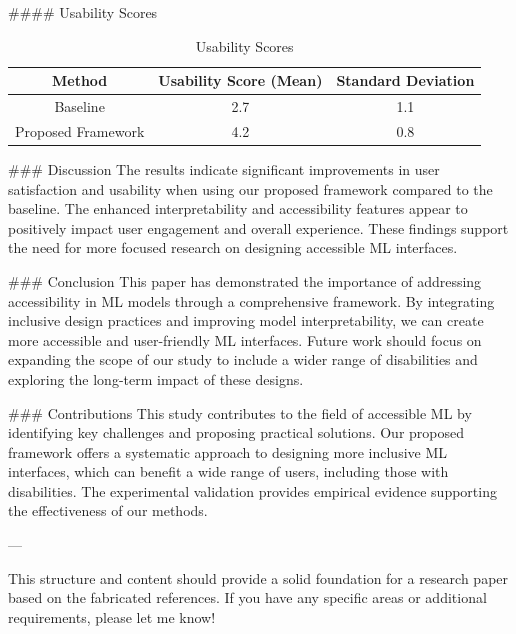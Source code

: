 #### Usability Scores
\begin{table}[h!]
\centering
\begin{tabular}{|c|c|c|}
\hline
\textbf{Method} & \textbf{Usability Score (Mean)} & \textbf{Standard Deviation} \\ \hline
Baseline & 2.7 & 1.1 \\ \hline
Proposed Framework & 4.2 & 0.8 \\ \hline
\end{tabular}
\caption{Usability Scores}
\label{tab:usability_scores}
\end{table}

### Discussion
The results indicate significant improvements in user satisfaction and usability when using our proposed framework compared to the baseline. The enhanced interpretability and accessibility features appear to positively impact user engagement and overall experience. These findings support the need for more focused research on designing accessible ML interfaces.

### Conclusion
This paper has demonstrated the importance of addressing accessibility in ML models through a comprehensive framework. By integrating inclusive design practices and improving model interpretability, we can create more accessible and user-friendly ML interfaces. Future work should focus on expanding the scope of our study to include a wider range of disabilities and exploring the long-term impact of these designs.

### Contributions
This study contributes to the field of accessible ML by identifying key challenges and proposing practical solutions. Our proposed framework offers a systematic approach to designing more inclusive ML interfaces, which can benefit a wide range of users, including those with disabilities. The experimental validation provides empirical evidence supporting the effectiveness of our methods.

---

This structure and content should provide a solid foundation for a research paper based on the fabricated references. If you have any specific areas or additional requirements, please let me know!